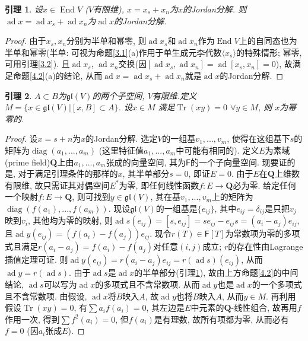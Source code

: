 \documentclass{ctexart}%
\newtheorem{lemma}{引理}
\theoremstyle{definition}
\theoremstyle{remark}
\DeclareMathOperator{\ad}{ad}
\DeclareMathOperator{\Tr}{Tr}
\DeclareMathOperator{\End}{End}
\DeclareMathOperator{\diag}{diag}
\begin{document}
\begin{lemma}\label{4.2.A}设$x\in \End V$ ($V$有限维), $x=x_s+x_n$为$x$的Jordan分解. 则$\ad x=\ad x_s+\ad x_n$为$\ad x$的Jordan分解.
\end{lemma}
\begin{proof}
由于$x_s,x_n$分别为半单和幂零, 则$\ad x_s$和$\ad x_n$作为$\End V$上的自同态也为半单和幂零(半单: 可视为命题\ref{3.1}(a)作用于单生成元李代数$\langle x_s\rangle$的特殊情形; 幂零, 可用引理\ref{3.2}). 且$\ad x_s$, $\ad  x_n$交换(因$[\ad x_s,\ad x_n] = \ad [x_s,x_n]=0$), 故满足命题\ref{4.2}(a)的结论, 从而$\ad x=\ad x_s+\ad x_n$就是$\ad x$的Jordan分解.
\end{proof}

\begin{lemma}\label{4.3}
$A\subset B$为$\mathfrak{gl}(V)$的两个子空间, $V$有限维.定义$M=\{x\in \mathfrak{gl}(V)|[x,B]\subset A\}$. 设$x\in M$ 满足$\Tr(xy)=0$ $\forall y\in M$, 则 $x$为幂零的.
\end{lemma}
\begin{proof}
设$x=s+n$为$x$的Jordan分解. 选定$V$的一组基$v_1,...,v_m$, 使得在这组基下$s$的矩阵为$\diag(a_1,...,a_m)$ (这里特征值$a_1,...,a_m$中可能有相同的). 定义$E$为素域(prime field)$\mathbf{Q}$上由$a_1,...,a_m$张成的向量空间, 其为$\mathsf{F}$的一个子向量空间. 现要证的是, 对于满足引理条件的那样的$x$, 其半单部分$s=0$, 即证$E=0$. 由于$E$在$\mathbf{Q}$上维数有限维, 故只需证其对偶空间$E^*$为零, 即任何线性函数$f\colon E\rightarrow \mathbf{Q}$必为零. 给定任何一个映射$f\colon E\rightarrow \mathbf{Q}$, 则可找到$y\in\mathfrak{gl}(V)$, 其在基$v_1,...,v_m$上的矩阵为$\diag(f(a_1),...,f(a_m))$. 现设$\mathfrak{gl}(V)$的一组基是$\{e_{ij}\}$, 其中$e_{ij}=\delta_{ij}$是只把$v_j$映到$v_i$, 其他均为零的映射, 则$\ad s(e_{ij})=[s, e_{ij}]=se_{ij}-e_{ij}s = (a_i-a_j)e_{ij}$, 且$\ad y(e_{ij})= (f(a_i)-f(a_j)) e_{ij}$. 现令$r(T)\in \mathsf{F}[T]$为常数项为零的多项式且满足$r(a_i-a_j) = f(a_i)-f(a_j)$对任意$(i,j)$成立; $r$的存在性由Lagrange插值定理可证. 则$\ad y(e_{ij}) = r(a_i-a_j)e_{ij}= r(\ad s)(e_{ij})$, 从而$\ad y=r(\ad s)$. 由于$\ad s$是$\ad x$的半单部分(引理\ref{4.2.A}), 故由上方命题\ref{4.2}的中间结论, $\ad s$可以写为$\ad x$的多项式且不含常数项. 从而$\ad y$也是$\ad x$的一个多项式且不含常数项. 由假设, $\ad x$将$B$映入$A$, 故$\ad y$也将$B$映入$A$, 从而$y\in M$. 再利用假设$\Tr(xy)=0$, 有$\sum a_i f(a_i)=0$, 其左边是$E$中元素的$\mathbf{Q}$-线性组合, 故再用$f$作用一次, 得到$\sum f^2(a_i)=0$, 但$f(a_i)$是有理数, 故所有项都为零, 从而必有$f=0$ (因$a_i$张成$E$).
\end{proof}
\end{document}
